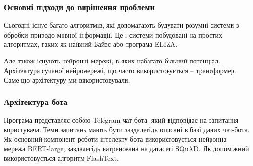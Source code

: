 \documentclass{beamer}
\begin{document}
\begin{frame}
    \frametitle{Основні підходи до вирішення проблеми}
    Сьогодні існує багато алгоритмів, які допомагають будувати розумні системи з обробки природо-мовної інформації. Це і системи побудовані на простих алгоритмах, таких як наївний Байес або програма ELIZA.

    Але також існують нейронні мережі, в яких набагато більний потенціал. Архітектура сучаної нейромережі, що часто використовується -- трансформер. Саме цю архітектуру ми використовували.
\end{frame}

\begin{frame}
    \frametitle{Архітектура бота}
    Програма представляє собою Telegram чат-бота, який відповідає на запитання користувача. Теми запитань мають бути заздалегідь описані в базі даних чат-бота. Як основний компонент роботи інтелекту бота використовується нейронна мережа BERT-large, заздалегідь натренована на датасеті SQuAD. Як допоміжний використовується алгоритм FlashText.
\end{frame}



\end{document}

